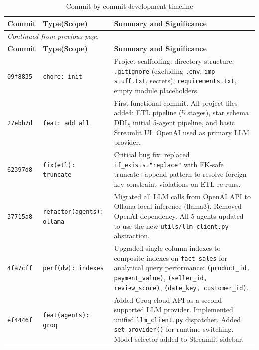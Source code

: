 \documentclass[12pt,a4paper]{report}
\begin{document}
\begin{longtable}{lp{2.8cm}p{8cm}}
  \caption{Commit-by-commit development timeline}
  \label{tab:commits} \\
  \toprule
  \textbf{Commit} & \textbf{Type(Scope)} & \textbf{Summary and Significance} \\
  \midrule
  \endfirsthead
  \multicolumn{3}{l}{\emph{Continued from previous page}} \\
  \toprule
  \textbf{Commit} & \textbf{Type(Scope)} & \textbf{Summary and Significance} \\
  \midrule
  \endhead
  \bottomrule
  \endlastfoot

  \texttt{09f8835} &
  \texttt{chore: init} &
  Project scaffolding: directory structure, \texttt{.gitignore} (excluding \texttt{.env},
  \texttt{imp stuff.txt}, secrets), \texttt{requirements.txt}, empty module placeholders. \\[4pt]

  \texttt{27ebb7d} &
  \texttt{feat: add all} &
  First functional commit. All project files added: ETL pipeline (5 stages), star schema DDL,
  initial 5-agent pipeline, and basic Streamlit UI. OpenAI used as primary LLM provider. \\[4pt]

  \texttt{62397d8} &
  \texttt{fix(etl): truncate} &
  Critical bug fix: replaced \texttt{if\_exists="replace"} with FK-safe truncate+append pattern
  to resolve foreign key constraint violations on ETL re-runs. \\[4pt]

  \texttt{37715a8} &
  \texttt{refactor(agents): ollama} &
  Migrated all LLM calls from OpenAI API to Ollama local inference (llama3). Removed OpenAI
  dependency. All 5 agents updated to use the new \texttt{utils/llm\_client.py} abstraction. \\[4pt]

  \texttt{4fa7cff} &
  \texttt{perf(dw): indexes} &
  Upgraded single-column indexes to composite indexes on \texttt{fact\_sales} for analytical
  query performance: \texttt{(product\_id, payment\_value)}, \texttt{(seller\_id, review\_score)},
  \texttt{(date\_key, customer\_id)}. \\[4pt]

  \texttt{ef4446f} &
  \texttt{feat(agents): groq} &
  Added Groq cloud API as a second supported LLM provider. Implemented unified
  \texttt{llm\_client.py} dispatcher. Added \texttt{set\_provider()} for runtime switching.
  Model selector added to Streamlit sidebar. \\[4pt]


\end{longtable}
\end{document}
